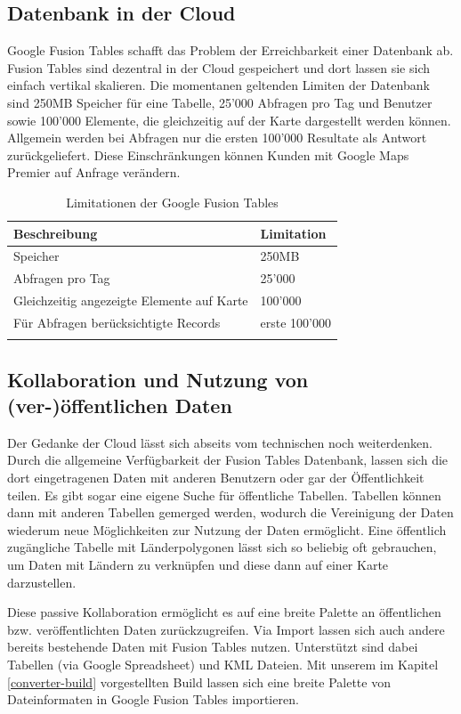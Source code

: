 \subsection{Datenbank in der Cloud}
Google Fusion Tables schafft das Problem der Erreichbarkeit einer Datenbank ab. Fusion Tables sind dezentral in der Cloud gespeichert und dort lassen sie sich einfach vertikal skalieren. Die momentanen geltenden Limiten der Datenbank sind 250MB Speicher für eine Tabelle, 25'000 Abfragen pro Tag und Benutzer sowie 100'000 Elemente, die gleichzeitig auf der Karte dargestellt werden können. Allgemein werden bei Abfragen nur die ersten 100'000 Resultate als Antwort zurückgeliefert. Diese Einschränkungen können Kunden mit Google Maps Premier auf Anfrage verändern. \cite{fusion-tables-geo-limits}

\begin{longtable}{|l|l|}
\hline 
\textbf{Beschreibung} & \textbf{Limitation} \\ 
\hline 
Speicher & 250MB \\ 
\hline 
Abfragen pro Tag & 25'000 \\ 
\hline 
Gleichzeitig angezeigte Elemente auf Karte & 100'000 \\ 
\hline 
Für Abfragen berücksichtigte Records & erste 100'000 \\ 
\hline 
\caption{Limitationen der Google Fusion Tables}
\label{gft-limitations}
\end{longtable} 

\subsection{Kollaboration und Nutzung von (ver-)öffentlichen Daten}
Der Gedanke der Cloud lässt sich abseits vom technischen noch weiterdenken. Durch die allgemeine Verfügbarkeit der Fusion Tables Datenbank, lassen sich die dort eingetragenen Daten mit anderen Benutzern oder gar der Öffentlichkeit teilen. Es gibt sogar eine eigene Suche für öffentliche Tabellen.\cite{fusion-tables-search} Tabellen können dann mit anderen Tabellen gemerged werden, wodurch die Vereinigung der Daten wiederum neue Möglichkeiten zur Nutzung der Daten ermöglicht. Eine öffentlich zugängliche Tabelle mit Länderpolygonen lässt sich so beliebig oft gebrauchen, um Daten mit Ländern zu verknüpfen und diese dann auf einer Karte darzustellen.

Diese passive Kollaboration ermöglicht es auf eine breite Palette an öffentlichen bzw. veröffentlichten Daten zurückzugreifen. Via Import lassen sich auch andere bereits bestehende Daten mit Fusion Tables nutzen. Unterstützt sind dabei Tabellen (via Google Spreadsheet) und KML Dateien. Mit unserem im Kapitel \ref{converter-build} vorgestellten Build lassen sich eine breite Palette von Dateinformaten in Google Fusion Tables importieren.

